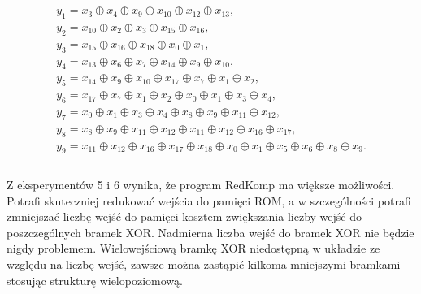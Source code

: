 \begin{multline} \\
y_1 = x_3 \oplus x_4 \oplus x_9 \oplus x_{10} \oplus x_{12} \oplus x_{13}, \\
y_2 = x_{10} \oplus x_2 \oplus x_3 \oplus x_{15} \oplus x_{16}, \\
y_3 = x_{15} \oplus x_{16} \oplus x_{18} \oplus x_0 \oplus x_1, \\
y_4 = x_{13} \oplus x_6 \oplus x_7 \oplus x_{14} \oplus x_9 \oplus x_{10}, \\
y_5 = x_{14} \oplus x_9 \oplus x_{10} \oplus x_{17} \oplus x_7 \oplus x_1 \oplus x_2, \\
y_6 = x_{17} \oplus x_7 \oplus x_1 \oplus x_2 \oplus x_0 \oplus x_1 \oplus x_3 \oplus x_4, \\
y_7 = x_0 \oplus x_1 \oplus x_3 \oplus x_4 \oplus x_8 \oplus x_9 \oplus x_{11} \oplus x_{12}, \\
y_8 = x_8 \oplus x_9 \oplus x_{11} \oplus x_{12} \oplus x_{11} \oplus x_{12} \oplus x_{16} \oplus x_{17}, \\
y_9 = x_{11} \oplus x_{12} \oplus x_{16} \oplus x_{17} \oplus x_{18} \oplus x_0 \oplus x_1 \oplus x_5 \oplus x_6 \oplus x_8 \oplus x_9. \\
\end{multline} \\

Z eksperymentów 5 i 6 wynika, że program RedKomp ma większe możliwości.
Potrafi skuteczniej redukować wejścia do pamięci ROM,
a w szczególności potrafi zmniejszać liczbę wejść do pamięci
kosztem zwiększania liczby wejść do poszczególnych bramek XOR.
Nadmierna liczba wejść do bramek XOR nie będzie nigdy problemem.
Wielowejściową bramkę XOR niedostępną w układzie ze względu na liczbę wejść,
zawsze można zastąpić kilkoma mniejszymi bramkami stosując strukturę wielopoziomową.
